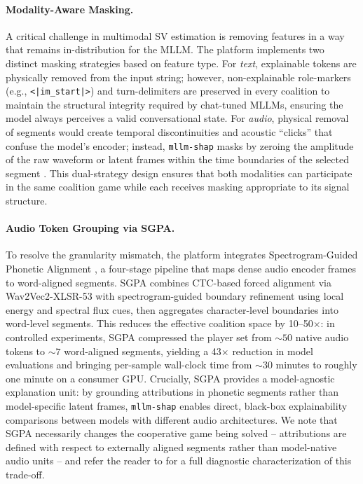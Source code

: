 \documentclass[11pt]{article}
\begin{document}
\paragraph{Modality-Aware Masking.}
A critical challenge in multimodal SV estimation is removing features in a way that remains in-distribution for the MLLM. The platform implements two distinct masking strategies based on feature type.
For \emph{text}, explainable tokens are physically removed from the input string; however, non-explainable role-markers (e.g., \texttt{<|im\_start|>}) and turn-delimiters are preserved in every coalition to maintain the structural integrity required by chat-tuned MLLMs, ensuring the model always perceives a valid conversational state.
For \emph{audio}, physical removal of segments would create temporal discontinuities and acoustic ``clicks'' that confuse the model's encoder; instead, \texttt{mllm-shap} masks by zeroing the amplitude of the raw waveform or latent frames within the time boundaries of the selected segment \citep{covert2021explaining}.
This dual-strategy design ensures that both modalities can participate in the same coalition game while each receives masking appropriate to its signal structure.

\paragraph{Audio Token Grouping via SGPA.}

To resolve the granularity mismatch, the platform integrates Spectrogram-Guided Phonetic Alignment \citep{pozorski2026sgpa}, a four-stage pipeline that maps dense audio encoder frames to word-aligned segments.
SGPA combines CTC-based forced alignment \citep{graves2006connectionist} via Wav2Vec2-XLSR-53 \citep{baevski2020wav2vec} with spectrogram-guided boundary refinement using local energy and spectral flux cues, then aggregates character-level boundaries into word-level segments.
This reduces the effective coalition space by 10--50$\times$: in controlled experiments, SGPA compressed the player set from ${\sim}50$ native audio tokens to ${\sim}7$ word-aligned segments, yielding a 43$\times$ reduction in model evaluations and bringing per-sample wall-clock time from ${\sim}30$ minutes to roughly one minute on a consumer GPU.
Crucially, SGPA provides a model-agnostic explanation unit: by grounding attributions in phonetic segments rather than model-specific latent frames, \texttt{mllm-shap} enables direct, black-box explainability comparisons between models with different audio architectures.
We note that SGPA necessarily changes the cooperative game being solved -- attributions are defined with respect to externally aligned segments rather than model-native audio units -- and refer the reader to \citet{pozorski2026sgpa} for a full diagnostic characterization of this trade-off.
\end{document}
